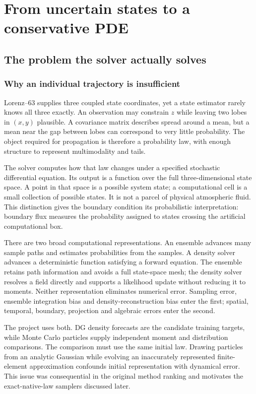 \part{From uncertain states to a conservative PDE}
\chapter{The problem the solver actually solves}\label{ch:purpose}
\section{Why an individual trajectory is insufficient}
Lorenz--63 supplies three coupled state coordinates, yet a state estimator rarely knows all three exactly. An observation may constrain $z$ while leaving two lobes in $(x,y)$ plausible. A covariance matrix describes spread around a mean, but a mean near the gap between lobes can correspond to very little probability. The object required for propagation is therefore a probability law, with enough structure to represent multimodality and tails.

The solver computes how that law changes under a specified stochastic differential equation. Its output is a function over the full three-dimensional state space. A point in that space is a possible system state; a computational cell is a small collection of possible states. It is not a parcel of physical atmospheric fluid. This distinction gives the boundary condition its probabilistic interpretation: boundary flux measures the probability assigned to states crossing the artificial computational box.

There are two broad computational representations. An ensemble advances many sample paths and estimates probabilities from the samples. A density solver advances a deterministic function satisfying a forward equation. The ensemble retains path information and avoids a full state-space mesh; the density solver resolves a field directly and supports a likelihood update without reducing it to moments. Neither representation eliminates numerical error. Sampling error, ensemble integration bias and density-reconstruction bias enter the first; spatial, temporal, boundary, projection and algebraic errors enter the second.

The project uses both. DG density forecasts are the candidate training targets, while Monte Carlo particles supply independent moment and distribution comparisons. The comparison must use the same initial law. Drawing particles from an analytic Gaussian while evolving an inaccurately represented finite-element approximation confounds initial representation with dynamical error. This issue was consequential in the original method ranking and motivates the exact-native-law samplers discussed later.

